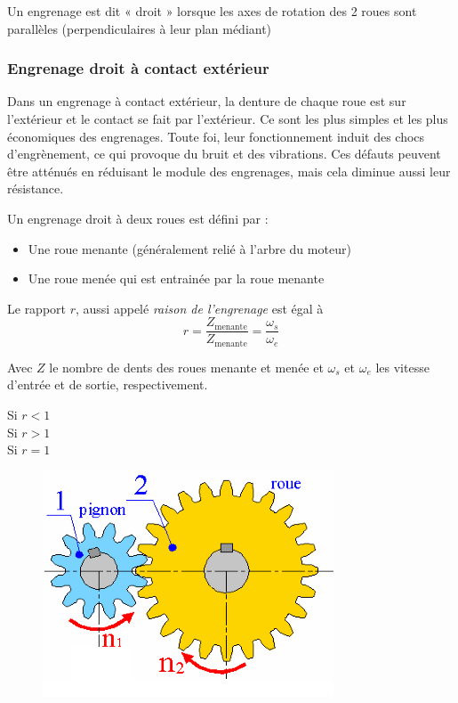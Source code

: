 \documentclass[10pt,fleqn]{article} %
\begin{document}
\begin{definition}
  Un engrenage est dit « droit » lorsque les axes de rotation des 2 roues sont parallèles (perpendiculaires à leur plan médiant)
\end{definition}

\subsubsection{Engrenage droit à contact extérieur}
Dans un engrenage à contact extérieur, la denture de chaque roue est sur l’extérieur et le contact se fait par l’extérieur.
Ce sont les plus simples et les plus économiques des engrenages. Toute foi, leur fonctionnement induit des chocs d’engrènement, ce qui provoque du bruit et des vibrations. Ces défauts peuvent être atténués en réduisant le module des engrenages, mais cela diminue aussi leur résistance.
\begin{aretenir}
Un engrenage droit à deux roues est défini par :
\begin{itemize}
  \item Une roue menante (généralement relié à l'arbre du moteur)
  \item Une roue menée qui est entrainée par la roue menante
\end{itemize}
\end{aretenir}

\begin{definition}
  Le rapport $r$, aussi appelé \textit{raison de l'engrenage} est égal à $$r = \frac{Z_{\text{menante}}}{Z_{\text{menante}}} = \frac{\omega_s}{\omega_e}$$

  Avec $Z$ le nombre de dents des roues menante et menée et $\omega_s$ et $\omega_e$ les vitesse d'entrée et de sortie, respectivement.
\end{definition}

\begin{description}
  \item [Si $r<1$] 
  \item [Si $r>1$] 
  \item [Si $r=1$] 
\end{description}

\begin{figure}[h]
  \centering
  \includegraphics[width=.4\textwidth]{images/engrenage_2_droit}
  \caption{}
  \label{}
\end{figure}
\end{document}
